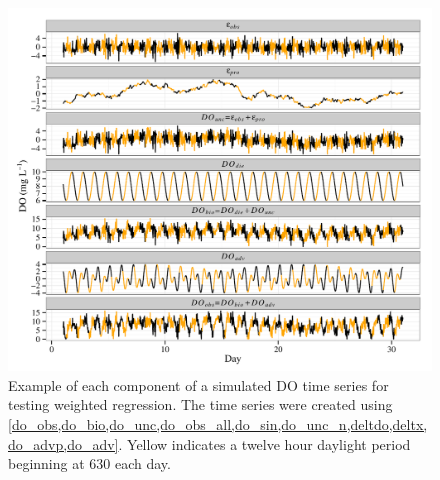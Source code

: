 \documentclass[letterpaper,12pt,oneside]{article}\usepackage[]{graphicx}\usepackage[]{color}
\makeatletter
\def\maxwidth{ %
  \ifdim\Gin@nat@width>\linewidth
    \linewidth
  \else
    \Gin@nat@width
  \fi
}
\newenvironment{knitrout}{}{} %
\makeatother
\begin{document}
\centering\vspace*{\fill}
\begin{knitrout}
\color{fgcolor}\begin{figure}[!ht]


{\centering \includegraphics[width=\maxwidth]{figure/do_sim} 

}

\caption[Example of each component of a simulated \ac{DO} time series for testing weighted regression]{Example of each component of a simulated \ac{DO} time series for testing weighted regression.  The time series were created using \cref{do_obs,do_bio,do_unc,do_obs_all,do_sin,do_unc_n,deltdo,deltx,do_advp,do_adv}. Yellow indicates a twelve hour daylight period beginning at 630 each day.\label{fig:do_sim}}
\end{figure}


\end{knitrout}
\vfill
\clearpage
\end{document}
